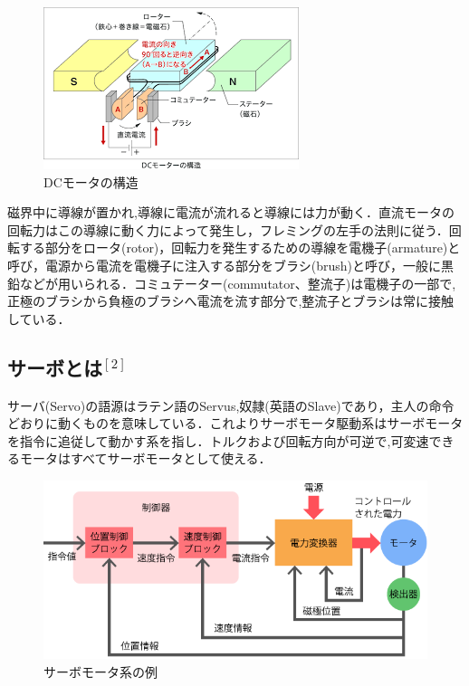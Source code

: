 \documentclass[xelatex,ja=standard,jafont=noto]{bxjsarticle}
\begin{document}
\begin{figure}[h!]
    \centering
    \includegraphics[scale=0.75]{012.png}
    \caption{DCモータの構造 }
\end{figure}


磁界中に導線が置かれ,導線に電流が流れると導線には力が動く．直流モータの回転力はこの導線に動く力によって発生し，フレミングの左手の法則に従う．回転する部分をロータ(rotor)，回転力を発生するための導線を電機子(armature)と呼び，電源から電流を電機子に注入する部分をブラシ(brush)と呼び，一般に黒鉛などが用いられる．コミュテーター(commutator、整流子)は電機子の一部で,正極のブラシから負極のブラシへ電流を流す部分で,整流子とブラシは常に接触している．\\




\subsection{サーボとは$ ^{[2]}　$}

サーバ(Servo)の語源はラテン語のServus,奴隷(英語のSlave)であり，主人の命令どおりに動くものを意味している．これよりサーボモータ駆動系はサーボモータを指令に追従して動かす系を指し．トルクおよび回転方向が可逆で,可変速できるモータはすべてサーボモータとして使える．

\begin{figure}[h!]
    \centering
    \includegraphics[scale=0.3]{013.png}
    \caption{サーボモータ系の例 }
\end{figure}
\end{document}
